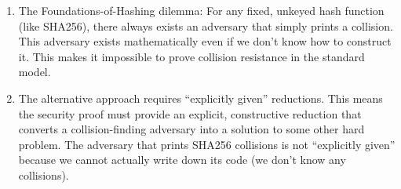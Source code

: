 \ifsolutions
\begin{mysolution}
  \begin{enumerate}
    \item The Foundations-of-Hashing dilemma: For any fixed, unkeyed hash function (like SHA256), there always exists an adversary that simply prints a collision.
    This adversary exists mathematically even if we don't know how to construct it.
    This makes it impossible to prove collision resistance in the standard model.
    \item The alternative approach requires ``explicitly given'' reductions.
    This means the security proof must provide an explicit, constructive reduction that converts a collision-finding adversary into a solution to some other hard problem.
    The adversary that prints SHA256 collisions is not ``explicitly given'' because we cannot actually write down its code (we don't know any collisions).
  \end{enumerate}
\end{mysolution}
\fi
